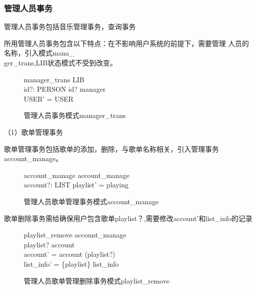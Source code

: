 \documentclass[14pt]{article}
\numberwithin{figure}{subsection}
\begin{document}
\subsubsection{管理人员事务}
管理人员事务包括音乐管理事务，查询事务

所用管理人员事务包含以下特点：在不影响用户系统的前提下，需要管理
人员的名称，引入模式mana\_\\ger\_trans,LIB状态模式不受到改变。
\vspace{-0.5cm}
\begin{figure}[H]
    \setlength{\abovecaptionskip}{0.cm}
    \setlength{\belowcaptionskip}{0.cm}
    \begin{schema}{manager\_trans}
        \Delta LIB\\
        id?: PERSON
        \where
        id? \in manager\\
        \theta USER' = \theta USER
    \end{schema}
    \caption{管理人员事务模式manager\_trans}
\end{figure}
\vspace*{-0.5cm}
（1）歌单管理事务

歌单管理事务包括歌单的添加，删除，与歌单名称相关，引入管理事务account\_manage。
\vspace{-0.5cm}
\begin{figure}[H]
    \setlength{\abovecaptionskip}{0.cm}
    \setlength{\belowcaptionskip}{0.cm}
    \begin{schema}{account\_manage}
        account\_manage\\
        account?: LIST
        \where
        playlist' = playing
    \end{schema}
    \caption{管理人员歌单管理事务模式account\_manage}
\end{figure}
\vspace*{-0.5cm}
歌单删除事务需给确保用户包含歌单playlist？,需要修改account'和list\_info的记录

\vspace{-0.5cm}
\begin{figure}[H]
    \setlength{\abovecaptionskip}{0.cm}
    \setlength{\belowcaptionskip}{0.cm}
    \begin{schema}{playlist\_remove}
        account\_manage\\
        \where
        playlist? \in account\\
        account' = account \setminus (playlist?)\\
        list\_info' = \{playlist\} \ndres list\_info
    \end{schema}
    \caption{管理人员歌单管理删除事务模式playlist\_remove}
\end{figure}
\end{document}
